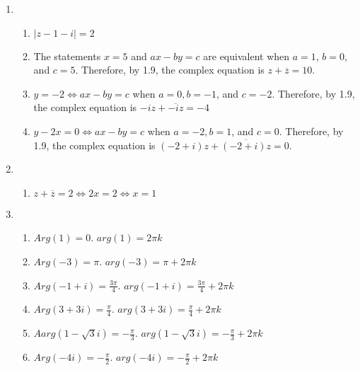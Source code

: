 \documentclass{article}%
\newcommand\abs[1]{\left|#1\right|}
\newenvironment{proof}[1][]{\begin{samepage}\textbf{Proof #1} }{\rule{0.5em}{0.5em} \end{samepage}}
\begin{document}
\begin{enumerate}
\begin{enumerate}[label*=\arabic*.]
\begin{proof}[$z\bar{z}-\xi\bar{z}-\bar{\xi}z=c$ is the equation of a circle centered at $\xi$ with radius $\sqrt{c + \abs{\xi}^2}$]
\begin{eqnarray*}
               (z - \xi)\overline(x-\xi) &=& c + \abs{\xi}^2 \\
               \abs{z - \xi}^2 &=& c + \abs{\xi}^2 \\
               \abs{z - \xi} &=& \sqrt{c + \abs{\xi}^2}
            \end{eqnarray*}
        \end{proof}
        \item %
        \begin{enumerate}[label=\alph*]
            \item $\abs{z - 1 - i} = 2$
            \item The statements $x=5$ and $ax-by=c$ are equivalent when $a=1$, $b=0$, and $c=5$. Therefore, by 1.9, the complex equation is $z+\overline{z}=10$.
            \item $y=-2 \Leftrightarrow ax-by=c$ when $a=0, b=-1$, and $c=-2$. Therefore, by 1.9, the complex equation is $-iz+\overline{-iz}=-4$
            \item $y-2x=0 \Leftrightarrow ax-by=c$ when $a=-2, b=1$, and $c=0$. Therefore, by 1.9, the complex equation is $(-2+i)z+\overline{(-2+i)z}=0$.
        \end{enumerate}
        \item %
        \begin{enumerate}[label=\alph*]
            \item %
                $z+\overline{z}=2 \Leftrightarrow 2x=2 \Leftrightarrow x=1$
        \end{enumerate}
        \item %
        \begin{enumerate}[label=\alph*]
            \item %
                $Arg(1) = 0$. $arg(1)=2\pi k$
            \item %
                $Arg(-3)=\pi$. $arg(-3)=\pi + 2\pi k$
            \item %
                $Arg(-1+i)=\frac{3\pi}{4}$. $arg(-1+i)=\frac{3\pi}{4}+2\pi k$
            \item %
                $Arg(3+3i)=\frac{\pi}{4}$. $arg(3+3i)=\frac{\pi}{4}+2\pi k$
            \item %
                $Aarg(1-\sqrt{3}i)=-\frac{\pi}{3}$. $arg(1-\sqrt{3}i)=-\frac{\pi}{3}+2\pi k$
            \item %
                $Arg(-4i)=-\frac{\pi}{2}$. $arg(-4i)=-\frac{\pi}{2}+2\pi k$
        \end{enumerate}

\end{enumerate}
\end{enumerate}
\end{document}
